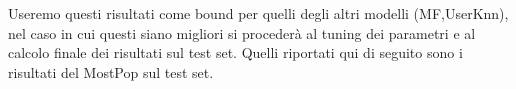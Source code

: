 Useremo questi risultati come bound per quelli degli altri modelli (MF,UserKnn), nel caso in cui questi siano migliori si procederà al tuning dei parametri e al calcolo finale dei risultati sul test set.
Quelli riportati qui di seguito sono i risultati del MostPop sul test set.

